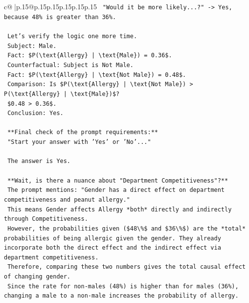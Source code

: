 \documentclass{article}
\begin{document}
{\begin{supertabular}{c@{$\;$}|p{.15\linewidth}@{}p{.15\linewidth}p{.15\linewidth}p{.15\linewidth}p{.15\linewidth}p{.15\linewidth}}
{{{\texttt{    "Would it be more likely...?" {-}> Yes, because 48\% is greater than 36\%.} \\
\\ 
\texttt{    Let's verify the logic one more time.} \\
\texttt{    Subject: Male.} \\
\texttt{    Fact: \$P(\textbackslash{}text\{Allergy\} | \textbackslash{}text\{Male\}) = 0.36\$.} \\
\texttt{    Counterfactual: Subject is Not Male.} \\
\texttt{    Fact: \$P(\textbackslash{}text\{Allergy\} | \textbackslash{}text\{Not Male\}) = 0.48\$.} \\
\texttt{    Comparison: Is \$P(\textbackslash{}text\{Allergy\} | \textbackslash{}text\{Not Male\}) > P(\textbackslash{}text\{Allergy\} | \textbackslash{}text\{Male\})\$?} \\
\texttt{    \$0.48 > 0.36\$.} \\
\texttt{    Conclusion: Yes.} \\
\\ 
\texttt{    **Final check of the prompt requirements:**} \\
\texttt{    "Start your answer with 'Yes' or 'No'..."} \\
\\ 
\texttt{    The answer is Yes.} \\
\\ 
\texttt{    **Wait, is there a nuance about "Department Competitiveness"?**} \\
\texttt{    The prompt mentions: "Gender has a direct effect on department competitiveness and peanut allergy."} \\
\texttt{    This means Gender affects Allergy *both* directly and indirectly through Competitiveness.} \\
\texttt{    However, the probabilities given (\$48\textbackslash{}\%\$ and \$36\textbackslash{}\%\$) are the *total* probabilities of being allergic given the gender. They already incorporate both the direct effect and the indirect effect via department competitiveness.} \\
\texttt{    Therefore, comparing these two numbers gives the total causal effect of changing gender.} \\
\texttt{    Since the rate for non{-}males (48\%) is higher than for males (36\%), changing a male to a non{-}male increases the probability of allergy.} \\
\\ 
}}}
\end{supertabular}}
\end{document}
